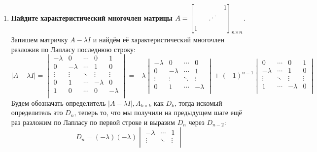 \documentclass[12pt]{article} %
\begin{document}
\begin{enumerate}
    \item \textbf{Найдите характеристический многочлен матрицы $A = 
    \begin{bmatrix}
         &&1\\
         &\rotatebox[origin=c]{75}{$\ddots$}&\\
         1&& \\
    \end{bmatrix}_{n \times n}
    $}.\\

    Запишем матричку $A - \lambda I$ и найдём её характеристический многочлен разложив по Лапласу последнюю строку: 
    \[
    |A - \lambda I| = 
    \begin{vmatrix}
        -\lambda & 0 & \cdots & 0 & 1\\
        0 & -\lambda & \cdots & 1 & 0\\
        \vdots & \vdots & \ddots & \vdots & \vdots \\
        0 & 1 & \cdots & -\lambda & 0\\
        1 & 0 & \cdots & 0 & -\lambda\\
    \end{vmatrix} = 
    -\lambda 
    \begin{vmatrix}
        -\lambda & 0 & \cdots & 0 \\
        0 & -\lambda & \cdots & 1 \\
        \vdots & \vdots & \ddots & \vdots  \\
        0 & 1 & \cdots & -\lambda \\
    \end{vmatrix}
     + (-1)^{n - 1}
     \begin{vmatrix}
          0 & \cdots & 0 & 1\\
         -\lambda & \cdots & 1 & 0\\
         \vdots & \ddots & \vdots & \vdots \\
         1 & \cdots & -\lambda & 0\\
     \end{vmatrix}
    \]
    Будем обозначать определитель $|A - \lambda I|, A_{k \times k}$ как $D_k$, тогда искомый определитель это $D_n$, теперь то, что мы получили на предыдущем шаге ещё раз разложим по Лапласу по первой строке и выразим $D_n$ через $D_{n - 2}$:
    \[
    D_n = (-\lambda)(-\lambda)
    \begin{vmatrix}
        -\lambda & \cdots & 1\\
        \vdots & \ddots & \vdots \\

\end{vmatrix}\]
\end{enumerate}
\end{document}
